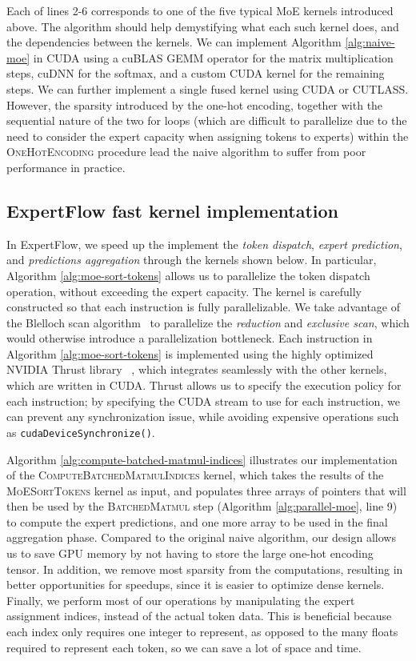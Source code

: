 Each of lines 2-6 corresponds to one of the five typical MoE kernels introduced above. The algorithm should help demystifying what each such kernel does, and the dependencies between the kernels. We can implement Algorithm \ref{alg:naive-moe} in CUDA using a cuBLAS GEMM operator for the matrix multiplication steps, cuDNN for the softmax, and a custom CUDA kernel for the remaining steps. We can further implement a single fused kernel using CUDA or CUTLASS. However, the sparsity introduced by the one-hot encoding, together with the sequential nature of the two for loops (which are difficult to parallelize due to the need to consider the expert capacity when assigning tokens to experts) within the \textsc{OneHotEncoding} procedure lead the naive algorithm to suffer from poor performance in practice.

\subsection{ExpertFlow fast kernel implementation}
In ExpertFlow, we speed up the implement the \textit{token dispatch}, \textit{expert prediction}, and \textit{predictions aggregation} through the kernels shown below. In particular, Algorithm \ref{alg:moe-sort-tokens} allows us to parallelize the token dispatch operation, without exceeding the expert capacity. The kernel is carefully constructed so that each instruction is fully parallelizable. We take advantage of the Blelloch scan algorithm~\cite{blelloch_prefix_1990} to parallelize the \textit{reduction} and \textit{exclusive scan}, which would otherwise introduce a parallelization bottleneck. Each instruction in Algorithm \ref{alg:moe-sort-tokens} is implemented using the highly optimized NVIDIA Thrust library ~\cite{thrust}, which integrates seamlessly with the other kernels, which are written in CUDA. Thrust allows us to specify the execution policy for each instruction; by specifying the CUDA stream to use for each instruction, we can prevent any synchronization issue, while avoiding expensive operations such as \texttt{cudaDeviceSynchronize()}.

Algorithm \ref{alg:compute-batched-matmul-indices} illustrates our implementation of the \textsc{ComputeBatchedMatmulIndices} kernel, which takes the results of the \textsc{MoESortTokens} kernel as input, and populates three arrays of pointers that will then be used by the \textsc{BatchedMatmul} step (Algorithm \ref{alg:parallel-moe}, line 9) to compute the expert predictions, and one more array to be used in the final aggregation phase. Compared to the original naive algorithm, our design allows us to save GPU memory by not having to store the large one-hot encoding tensor. In addition, we remove most sparsity from the computations, resulting in better opportunities for speedups, since it is easier to optimize dense kernels. Finally, we perform most of our operations by manipulating the expert assignment indices, instead of the actual token data. This is beneficial because each index only requires one integer to represent, as opposed to the many floats required to represent each token, so we can save a lot of space and time. 


